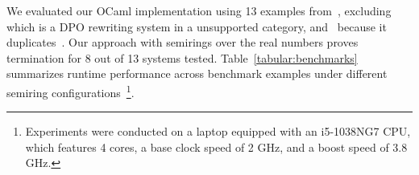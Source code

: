 We evaluated our OCaml implementation using 13 examples from~\cite{endrullis2024generalized_arxiv_v2,plump1995ontermination,plump2018modular,bruggink2015proving,bruggink2014termination}, excluding~\cite[Example 6.4]{endrullis2024generalized_arxiv_v2} which is a DPO rewriting system in a unsupported category, and~\cite[Example 6]{bruggink2014termination} because it duplicates~\cite[Example 4]{bruggink2015proving}. Our approach with semirings over the real numbers proves termination for 8 out of 13 systems tested. Table~\ref{tabular:benchmarks} summarizes runtime performance 
across benchmark examples under different semiring configurations~\footnote{Experiments were conducted on a laptop equipped with an i5-1038NG7 CPU, which features 4 cores, a base clock speed of 2 GHz, and a boost speed of 3.8 GHz.}.


